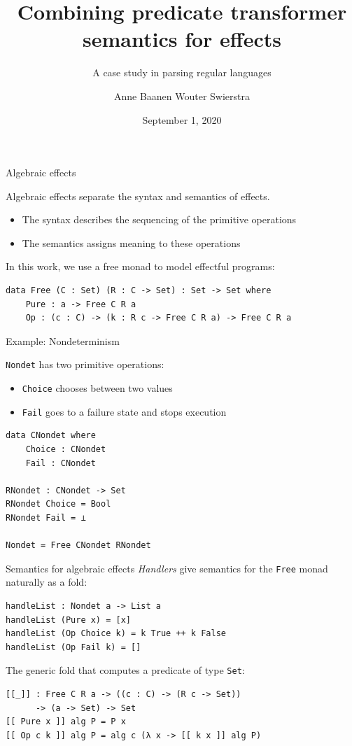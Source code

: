 \documentclass[ignorenonframetext,]{beamer}
\title[Combining predicate transformer semantics]{Combining predicate transformer semantics for effects}
\subtitle{A case study in parsing regular languages}
\author{Anne Baanen \hspace{5.1em} Wouter Swierstra}
\institute{Vrije Universiteit Amsterdam \hspace{1em} Utrecht University}
\date{September 1, 2020}
\date{}
\newcommand{\Agda}[1]{\texttt{#1}\xspace}
\newcommand{\Free}{\Agda{Free}}
\newcommand{\Set}{\Agda{Set}}
\begin{document}
\frame{\titlepage}

\begin{frame}[fragile]{Algebraic effects}

Algebraic effects separate the syntax and semantics of effects.

\begin{itemize}
	\item The syntax describes the sequencing of the primitive operations
	\item The semantics assigns meaning to these operations
\end{itemize}

In this work, we use a free monad to model effectful programs:

\begin{verbatim}
data Free (C : Set) (R : C -> Set) : Set -> Set where
    Pure : a -> Free C R a
    Op : (c : C) -> (k : R c -> Free C R a) -> Free C R a
\end{verbatim}
\end{frame}

\begin{frame}[fragile]{Example: Nondeterminism}

\Agda{Nondet} has two primitive operations:
\begin{itemize}
    \item \Agda{Choice} chooses between two values
    \item \Agda{Fail} goes to a failure state and stops execution
\end{itemize}
\begin{verbatim}
data CNondet where
	Choice : CNondet
	Fail : CNondet

RNondet : CNondet -> Set
RNondet Choice = Bool
RNondet Fail = ⊥

Nondet = Free CNondet RNondet
\end{verbatim}
\end{frame}

\begin{frame}[fragile]{Semantics for algebraic effects}
\emph{Handlers} give semantics for the \Free monad naturally as a fold:
\begin{verbatim}
handleList : Nondet a -> List a
handleList (Pure x) = [x]
handleList (Op Choice k) = k True ++ k False
handleList (Op Fail k) = []
\end{verbatim}

\pause
The generic fold that computes a predicate of type \Set:
\begin{verbatim}
[[_]] : Free C R a -> ((c : C) -> (R c -> Set))
      -> (a -> Set) -> Set
[[ Pure x ]] alg P = P x
[[ Op c k ]] alg P = alg c (λ x -> [[ k x ]] alg P)
\end{verbatim}
\end{frame}
\end{document}
